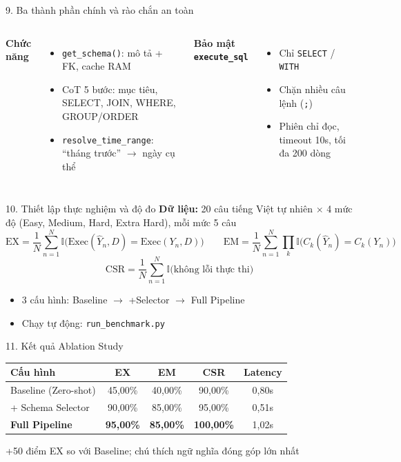 \documentclass[aspectratio=169,10pt]{beamer}
\begin{document}
\begin{frame}{9. Ba thành phần chính và rào chắn an toàn}
\begin{columns}[T]
\textbf{Chức năng}
\begin{itemize}
  \item \texttt{get\_schema()}: mô tả + FK, cache RAM
  \item CoT 5 bước: mục tiêu, SELECT, JOIN, WHERE, GROUP/ORDER
  \item \texttt{resolve\_time\_range}: ``tháng trước'' $\to$ ngày cụ thể
\end{itemize}
\textbf{Bảo mật \texttt{execute\_sql}}
\begin{itemize}
  \item Chỉ \texttt{SELECT} / \texttt{WITH}
  \item Chặn nhiều câu lệnh (\texttt{;})
  \item Phiên \alert{chỉ đọc}, timeout 10s, tối đa 200 dòng
\end{itemize}
\end{columns}
\end{frame}

\begin{frame}{10. Thiết lập thực nghiệm và độ đo}
\small
\textbf{Dữ liệu:} 20 câu tiếng Việt tự nhiên $\times$ 4 mức độ (Easy, Medium, Hard, Extra Hard), mỗi mức 5 câu
\vspace{0.2cm}
\[
\text{EX}=\frac{1}{N}\sum_{n=1}^{N}\mathbb{I}\big(\text{Exec}(\hat Y_n,D)=\text{Exec}(Y_n,D)\big)
\qquad
\text{EM}=\frac{1}{N}\sum_{n=1}^{N}\prod_{k}\mathbb{I}\big(C_k(\hat Y_n)=C_k(Y_n)\big)
\]
\[
\text{CSR}=\frac{1}{N}\sum_{n=1}^{N}\mathbb{I}\big(\text{không lỗi thực thi}\big)
\]
\begin{itemize}
  \item 3 cấu hình: Baseline $\to$ +Selector $\to$ Full Pipeline
  \item Chạy tự động: \texttt{run\_benchmark.py}
\end{itemize}
\end{frame}

\begin{frame}{11. Kết quả Ablation Study}
\centering
\begin{tabular}{lcccc}
\toprule
\textbf{Cấu hình} & \textbf{EX} & \textbf{EM} & \textbf{CSR} & \textbf{Latency} \\
\midrule
Baseline (Zero-shot) & 45,00\% & 40,00\% & 90,00\% & 0,80s \\
+ Schema Selector & 90,00\% & 85,00\% & 95,00\% & 0,51s \\
\rowcolor{blue!10}
\textbf{Full Pipeline} & \textbf{95,00\%} & \textbf{85,00\%} & \textbf{100,00\%} & 1,02s \\
\bottomrule
\end{tabular}
\vspace{0.5cm}

\alert{+50 điểm EX} so với Baseline; chú thích ngữ nghĩa đóng góp lớn nhất
\end{frame}
\end{document}
